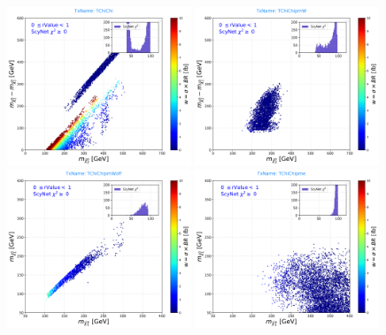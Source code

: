 \documentclass[a4paper,11pt]{article}
\begin{document}
\begin{figure}[!b]
	\centering
	\subfigure
	{ \includegraphics[width=0.49\textwidth]{Fig/Res/Missing_Weights/TChiChi.pdf}}
	\subfigure
	{\includegraphics[width=0.49\textwidth]{Fig/Res/Missing_Weights/TChiChipm_W.pdf}}
	\subfigure
	{\includegraphics[width=0.49\textwidth]{Fig/Res/Missing_Weights/TChiChipm_Woff.pdf}}	
	\subfigure
	{\includegraphics[width=0.49\textwidth]{Fig/Res/Missing_Weights/TChiChipme.pdf}}	

\end{figure}
\end{document}
